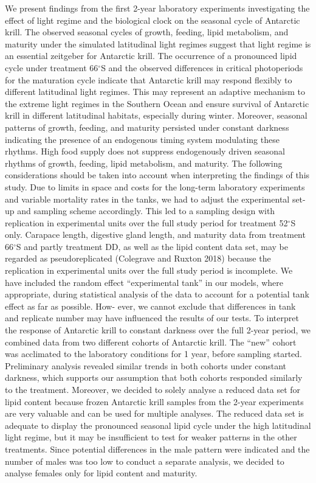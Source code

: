 We present findings from the first 2-year laboratory experiments investigating the effect of light regime and the biological clock on the seasonal cycle of Antarctic krill. 
The observed seasonal cycles of growth, feeding, lipid metabolism, and maturity under the simulated latitudinal light regimes suggest that light regime is an essential zeitgeber for Antarctic krill. The occurrence of a pronounced lipid cycle under treatment 66$^{\circ}$S and the observed differences in critical photoperiods for the maturation cycle indicate that Antarctic krill may respond flexibly to different latitudinal light regimes. This may represent an adaptive mechanism to the extreme light regimes in the Southern Ocean and ensure survival of Antarctic krill in different latitudinal habitats, especially during winter. Moreover, seasonal patterns of growth, feeding, and maturity persisted under constant darkness indicating the presence of an endogenous timing system modulating these rhythms. High food supply does not suppress endogenously driven seasonal rhythms of growth, feeding, lipid metabolism, and maturity. 
The following considerations should be taken into account when interpreting the findings of this study. Due to limits in space and costs for the long-term laboratory experiments and variable mortality rates in the tanks, we had to adjust the experimental set-up and sampling scheme accordingly. This led to a sampling design with replication in experimental units over the full study period for treatment 52$^{\circ}$S only. Carapace length, digestive gland length, and maturity data from treatment 66$^{\circ}$S and partly treatment DD, as well as the lipid content data set, may be regarded as pseudoreplicated (Colegrave and Ruxton 2018) because the replication in experimental units over the full study period is incomplete. We have included the random effect “experimental tank” in our models, where appropriate, during statistical analysis of the data to account for a potential tank effect as far as possible. How- ever, we cannot exclude that differences in tank and replicate number may have influenced the results of our tests. 
To interpret the response of Antarctic krill to constant darkness over the full 2-year period, we combined data from two different cohorts of Antarctic krill. The “new” cohort was acclimated to the laboratory conditions for 1 year, before sampling started. Preliminary analysis revealed similar trends in both cohorts under constant darkness, which supports our assumption that both cohorts responded similarly to the treatment. 
Moreover, we decided to solely analyse a reduced data set for lipid content because frozen Antarctic krill samples from the 2-year experiments are very valuable and can be used for multiple analyses. The reduced data set is adequate to display the pronounced seasonal lipid cycle under the high latitudinal light regime, but it may be insufficient to test for weaker patterns in the other treatments. Since potential differences in the male pattern were indicated and the number of males was too low to conduct a separate analysis, we decided to analyse females only for lipid content and maturity. 
